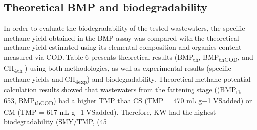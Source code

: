 \subsection{Theoretical BMP and biodegradability}
In order to evaluate the biodegradability of the tested wastewaters, the specific methane yield obtained in the BMP assay was compared with the theoretical methane yield estimated using its elemental composition and organics content measured via COD. Table 6 presents theoretical results (BMP\textsubscript{th}, BMP\textsubscript{thCOD}, and CH\textsubscript{4th} ) using both methodologies, as well as experimental results (specific methane yields and CH\textsubscript{4exp}) and  biodegradability.  Theoretical methane potential calculation results showed that wastewaters from the fattening stage ((BMP\textsubscript{th} = 653, BMP\textsubscript{thCOD}) had a higher TMP than CS (TMP = 470 mL g−1 VSadded) or CM (TMP = 617 mL g−1 VSadded). Therefore, KW had the highest biodegradability (SMY/TMP, %
(45%
